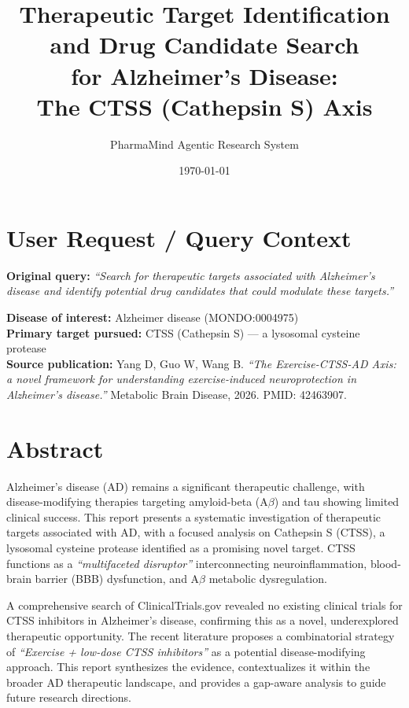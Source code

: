 \documentclass[11pt, a4paper]{article}
\title{\textbf{Therapeutic Target Identification and Drug Candidate Search \\ for Alzheimer's Disease: \\ The CTSS (Cathepsin S) Axis}}
\author{PharmaMind Agentic Research System}
\date{\today}
\begin{document}
\maketitle
\tableofcontents
\newpage

\section{User Request / Query Context}

\textbf{Original query:} \textit{``Search for therapeutic targets associated with Alzheimer's disease and identify potential drug candidates that could modulate these targets.''}

\textbf{Disease of interest:} Alzheimer disease (MONDO:0004975) \\
\textbf{Primary target pursued:} CTSS (Cathepsin S) — a lysosomal cysteine protease \\
\textbf{Source publication:} Yang D, Guo W, Wang B. \textit{``The Exercise-CTSS-AD Axis: a novel framework for understanding exercise-induced neuroprotection in Alzheimer's disease.''} Metabolic Brain Disease, 2026. PMID: 42463907.

\section{Abstract}

Alzheimer's disease (AD) remains a significant therapeutic challenge, with disease-modifying therapies targeting amyloid-beta (A$\beta$) and tau showing limited clinical success. This report presents a systematic investigation of therapeutic targets associated with AD, with a focused analysis on Cathepsin S (CTSS), a lysosomal cysteine protease identified as a promising novel target. CTSS functions as a \textit{``multifaceted disruptor''} interconnecting neuroinflammation, blood-brain barrier (BBB) dysfunction, and A$\beta$ metabolic dysregulation. 

A comprehensive search of ClinicalTrials.gov revealed no existing clinical trials for CTSS inhibitors in Alzheimer's disease, confirming this as a novel, underexplored therapeutic opportunity. The recent literature proposes a combinatorial strategy of \textit{``Exercise + low-dose CTSS inhibitors''} as a potential disease-modifying approach. This report synthesizes the evidence, contextualizes it within the broader AD therapeutic landscape, and provides a gap-aware analysis to guide future research directions.
\end{document}
